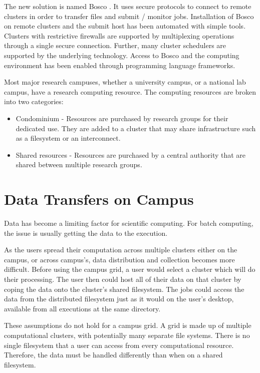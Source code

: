 The new solution is named Bosco \cite{TODO}.  It uses secure protocols to connect to remote clusters in order to transfer files and submit / monitor jobs.  Installation of Bosco on remote clusters and the submit host has been automated with simple tools.  Clusters with restrictive firewalls are supported by multiplexing operations through a single secure connection.  Further, many cluster schedulers are supported by the underlying technology.  Access to Bosco and the computing environment has been enabled through programming language frameworks.





Most major research campuses, whether a university campus, or a national lab campus, have a research computing resource.  The computing resources are broken into two categories:

\begin{itemize}

\item Condominium - Resources are purchased by research groups for their dedicated use.  They are added to a cluster that may share infrastructure such as a filesystem or an interconnect.
\item Shared resources -  Resources are purchased by a central authority that are shared between multiple research groups.

\end{itemize}





\section{Data Transfers on Campus}

Data has become a limiting factor for scientific computing.  For batch computing, the issue is usually getting the data to the execution.  

As the users spread their computation across multiple clusters either on the campus, or across campus's, data distribution and collection becomes more difficult.  Before using the campus grid, a user would select a cluster which will do their processing.  The user then could host all of their data on that cluster by coping the data onto the cluster's shared filesystem.  The jobs could access the data from the distributed filesystem just as it would on the user's desktop, available from all executions at the same directory.


These assumptions do not hold for a campus grid.  A grid is made up of multiple computational clusters, with potentially many separate file systems.  There is no single filesystem that a user can access from every computational resource.  Therefore, the data must be handled differently than when on a shared filesystem.  


